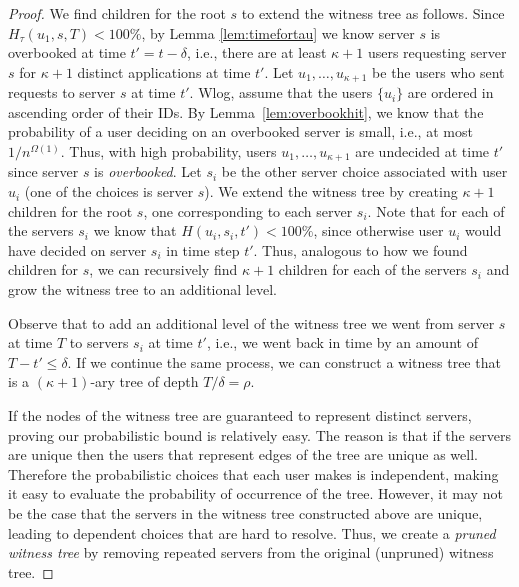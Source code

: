 \documentclass[conference]{IEEEtran}
\begin{document}
\begin{proof}
We find children for the root $s$ to extend the witness tree as follows. Since $H_\tau(u_1, s, T) < 100\%$, by Lemma \ref{lem:timefortau} we know server $s$ is overbooked at time $t' = t - \delta $, i.e., there are at least $\kappa + 1$  users requesting server $s$ for $\kappa + 1$ distinct applications at time $t' $. Let $u_1,\ldots,u_{\kappa+1}$ be the users who sent requests to server $s$ at time $t' $. Wlog, assume that the users $\{u_i\}$ are ordered in ascending order of their IDs.  By Lemma~\ref{lem:overbookhit}, we know that the probability of a user deciding on an overbooked server is small, i.e., at most $1/n^{\Omega(1)}$. Thus, with high probability, users $u_1,\ldots,u_{\kappa+1}$  are undecided at time $t'$ since server $s$ is \textsl{overbooked}. Let $s_i$ be the other server choice associated with user $u_i$ (one of the choices is server $s$).  We extend the witness tree by creating $\kappa +1$ children for the root $s$, one corresponding to each server $s_i$.  Note that for each of the servers $s_i$ we know that $H(u_i, s_i, t' ) < 100\%$, since otherwise user $u_i$ would have decided on server $s_i$ in time step $t' $. Thus, analogous to how we found children for $s$, we can recursively find $\kappa + 1$ children for each of the servers $s_i$ and grow the witness tree to an additional level.   

Observe that to add an additional level of the witness tree we went from server $s$ at time $T $ to servers $s_i$ at time $t' $, i.e., we went back in time by an amount of $T - t' \leq \delta $. If we continue the same process, we can construct a witness tree that is a $(\kappa + 1)$-ary tree of depth $T/\delta = \rho$. 


If the nodes of the witness tree are guaranteed to represent distinct servers, proving our probabilistic bound is relatively easy. The reason is that if the servers are unique then the users that represent edges of the tree are unique as well. Therefore the probabilistic choices that each user makes is independent, making it easy to evaluate the probability of occurrence of the tree. However, it may not be the case that the servers in the witness tree constructed above are unique, leading to dependent choices that are hard to resolve. Thus, we create a {\em pruned witness tree} by removing repeated servers from the  original (unpruned) witness tree. 


\end{proof}
\end{document}

